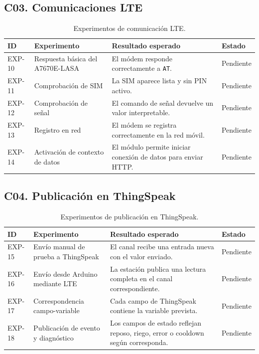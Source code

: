 \subsection{C03. Comunicaciones LTE}

\begin{table}[H]
\centering
\renewcommand{\arraystretch}{1.2}
\scriptsize
\begin{tabular}{|p{}|p{}|p{}|p{}|}
\hline
\rowcolor{gray!20}
\textbf{ID} & \textbf{Experimento} & \textbf{Resultado esperado} & \textbf{Estado} \\
\hline
EXP-10 & Respuesta básica del A7670E-LASA & El módem responde correctamente a \texttt{AT}. & Pendiente \\
\hline
EXP-11 & Comprobación de SIM & La SIM aparece lista y sin PIN activo. & Pendiente \\
\hline
EXP-12 & Comprobación de señal & El comando de señal devuelve un valor interpretable. & Pendiente \\
\hline
EXP-13 & Registro en red & El módem se registra correctamente en la red móvil. & Pendiente \\
\hline
EXP-14 & Activación de contexto de datos & El módulo permite iniciar conexión de datos para enviar HTTP. & Pendiente \\
\hline
\end{tabular}
\caption{Experimentos de comunicación LTE.}
\label{tab:exp_lte}
\end{table}

\subsection{C04. Publicación en ThingSpeak}

\begin{table}[H]
\centering
\renewcommand{\arraystretch}{1.2}
\scriptsize
\begin{tabular}{|p{}|p{}|p{}|p{}|}
\hline
\rowcolor{gray!20}
\textbf{ID} & \textbf{Experimento} & \textbf{Resultado esperado} & \textbf{Estado} \\
\hline
EXP-15 & Envío manual de prueba a ThingSpeak & El canal recibe una entrada nueva con el valor enviado. & Pendiente \\
\hline
EXP-16 & Envío desde Arduino mediante LTE & La estación publica una lectura completa en el canal correspondiente. & Pendiente \\
\hline
EXP-17 & Correspondencia campo-variable & Cada campo de ThingSpeak contiene la variable prevista. & Pendiente \\
\hline
EXP-18 & Publicación de evento y diagnóstico & Los campos de estado reflejan reposo, riego, error o cooldown según corresponda. & Pendiente \\
\hline
\end{tabular}
\caption{Experimentos de publicación en ThingSpeak.}
\label{tab:exp_thingspeak}
\end{table}


